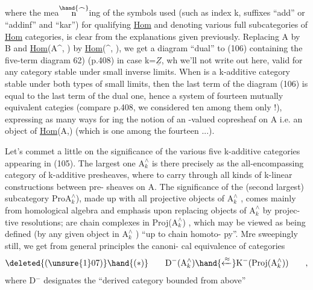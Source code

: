 where the  mea\(\overset{\hand{\frown}}{\text{n}}\)ing of the symbols used (such as index k,  suffixes
``add'' or ``addinf'' and ``kar'') for qualifying \uline{Hom}  and denoting various full
subcategories of \uline{Hom}  categories,  is clear from the explanations given
previously.  Replacing A by B and \uline{Hom}\hand{$_!$}(A\^{}, )  by \uline{Hom}\hand{$^!$}(\^{}, ),  we get a
diagram ``dual'' to (106)\hand{,} \hand{(}containing  the  five-term diagram \hand{(}62)
(p.408)  in case k=$\underline{Z}$\hand{)},  wh we'll not write out here,  valid for any 
category  stable under small inverse limits.   When  is a k-additive
category stable under both types of small limits,  then the last term of
the diagram (106)  is equal to the last term of the dual one,  hence
a system of fourteen mutually equivalent categies (compare p.408,  
we considered ten among them only !),  expressing as many ways for 
ing the notion of an -valued copresheaf on A i.e. an object of \uline{Hom}(A,)
(which is one among the fourteen ...).

Let's commet a little on the significance of the various five 
k-additive categories appearing in (105).  The largest one $\mathrm{A}^{\wedge}_{k}$  is there
precisely as the all-encompassing category of k-additive presheaves,
where to carry through all kinds of k-linear constructions between pre-%
sheaves on A.  The significance of the (second largest) subcategory
Pro\over{(}{(}$\mathrm{A}^{\wedge}_{k}$),  made up with all projective objects of $\mathrm{A}^{\wedge}_{k}$ ,  comes mainly from
homological algebra and emphasis upon replacing objects of $\mathrm{A}^{\wedge}_{k}$  by projec-%
tive resolutions;   are chain complexes in Proj($\mathrm{A}^{\wedge}_{k}$) ,  which may be
viewed as being defined (by any given object in $\mathrm{A}^{\wedge}_{k}$ ) ``up to chain homoto-%
py''.  Mre sweepingly\xout{,} still,  we get from general principles the canoni-%
cal equivalence of categories
\[ \deleted{(\unsure{1}07)}\hand{(*)} \qquad \mathrm{D}^{-}(\mathrm{A}^{\wedge}_{k}) \hand{\xleftarrow{\approx}} \mathrm{K}^{-}(\mathrm{Proj}(\mathrm{A}^{\wedge}_{k})) \qquad , \]
where  D$^{-}$  designates the  ``derived category bounded from above''

